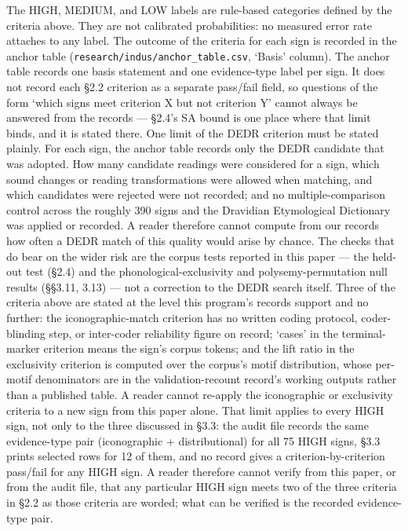 \documentclass[11pt]{article}
\begin{document}
The HIGH, MEDIUM, and LOW labels are rule-based categories defined by the criteria above. They are not calibrated probabilities: no measured error rate attaches to any label. The outcome of the criteria for each sign is recorded in the anchor table (\texttt{research/\allowbreak indus/\allowbreak anchor\_table.csv}, `Basis' column). The anchor table records one basis statement and one evidence-type label per sign. It does not record each §2.2 criterion as a separate pass/fail field, so questions of the form `which signs meet criterion X but not criterion Y' cannot always be answered from the records --- §2.4's SA bound is one place where that limit binds, and it is stated there. One limit of the DEDR criterion must be stated plainly. For each sign, the anchor table records only the DEDR candidate that was adopted. How many candidate readings were considered for a sign, which sound changes or reading transformations were allowed when matching, and which candidates were rejected were not recorded; and no multiple-comparison control across the roughly 390 signs and the Dravidian Etymological Dictionary was applied or recorded. A reader therefore cannot compute from our records how often a DEDR match of this quality would arise by chance. The checks that do bear on the wider risk are the corpus tests reported in this paper --- the held-out test (§2.4) and the phonological-exclusivity and polysemy-permutation null results (§§3.11, 3.13) --- not a correction to the DEDR search itself. Three of the criteria above are stated at the level this program's records support and no further: the iconographic-match criterion has no written coding protocol, coder-blinding step, or inter-coder reliability figure on record; `cases' in the terminal-marker criterion means the sign's corpus tokens; and the lift ratio in the exclusivity criterion is computed over the corpus's motif distribution, whose per-motif denominators are in the validation-recount record's working outputs rather than a published table. A reader cannot re-apply the iconographic or exclusivity criteria to a new sign from this paper alone. That limit applies to every HIGH sign, not only to the three discussed in §3.3: the audit file records the same evidence-type pair (iconographic + distributional) for all 75 HIGH signs, §3.3 prints selected rows for 12 of them, and no record gives a criterion-by-criterion pass/fail for any HIGH sign. A reader therefore cannot verify from this paper, or from the audit file, that any particular HIGH sign meets two of the three criteria in §2.2 as those criteria are worded; what can be verified is the recorded evidence-type pair.
\end{document}
